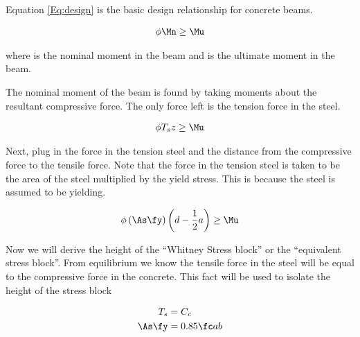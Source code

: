 \begin{figure}[h]
\end{figure}

Equation \ref{Eq:design} is the basic design relationship for concrete beams.


\begin{align}
	\phi \Mn \geq \Mu
	\label{Eq:design}
\end{align}

where \Mn is the nominal moment in the beam and \Mu is the ultimate moment in the beam.

The nominal moment of the beam is found by taking moments about the resultant compressive force. The only force left is the tension force in the steel.

\begin{align}
	\phi T_s z \geq \Mu
\end{align}

Next, plug in the force in the tension steel and the distance from the compressive force to the tensile force. Note that the force in the tension steel is taken to be the area of the steel multiplied by the yield stress. This is because the steel is assumed to be yielding.

\begin{align}
	\phi
	\left(\As \fy\right)
	\left(d-\frac{1}{2}a\right)
	\geq
	\Mu
	\label{Eq:2}
\end{align}

Now we will derive the height of the ``Whitney Stress block'' or the ``equivalent stress block''. From equilibrium we know the tensile force in the steel will be equal to the compressive force in the concrete. This fact will be used to isolate the height of the stress block

\begin{align}
	T_s &= C_c\\
	\As \fy &= 0.85 \fc ab
\end{align}

